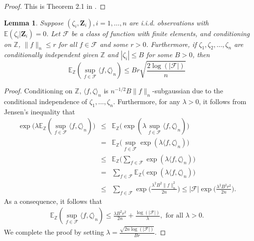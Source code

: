 \documentclass[11pt, preprint]{imsart}
\numberwithin{equation}{section}
\def \mcF{\mathcal{F}}
\def \bfZ{\mathbf{Z}}
\def \ev{\mathbb{E}}
\theoremstyle{plain}
\newtheorem{lemma}{\indent Lemma}
\theoremstyle{definition}
\begin{document}
\begin{proof}
This is Theorem 2.1 in \cite{bbm05}.
\end{proof}
\begin{lemma}\label{lemma:Massart:inequality}
Suppose $(\zeta_i, \bfZ_i), i=1,\ldots, n$ are i.i.d. observations with $\ev(\zeta_i | \bfZ_i)=0$. Let $\mcF$ be a class of function with finite elements, and  conditioning on $\mathbb{Z}$, $\|f\|_n\leq r$ for all $f\in \mcF$ and some $r>0$. Furthermore, if $\zeta_1,\zeta_2, \ldots, \zeta_n$ are conditionally independent given $\mathbb{Z}$ and $|\zeta_i|\leq B$ for some $B>0$, then 
\begin{equation*}
\ev_{\mathbb{Z}}(\sup_{f\in \mcF}\langle f, \zeta\rangle_n)\leq Br\sqrt{\frac{2\log(|\mcF|)}{n}}
\end{equation*}
\end{lemma}
\begin{proof}
Conditioning on $\mathbb{Z}$, $\langle f, \zeta\rangle_n$ is $n^{-1/2}B\|f\|_n$-subgaussian due to the conditional independence of $\zeta_1,\ldots, \zeta_n$. Furthermore, for any $\lambda>0$, it follows from Jensen’s inequality that
\begin{eqnarray*}
\exp\bigg(\lambda\ev_{\mathbb{Z}}(\sup_{f\in \mcF}\langle f, \zeta\rangle_n)\bigg)&\leq& \ev_{\mathbb{Z}}\bigg(\exp(\lambda\sup_{f\in \mcF}\langle f, \zeta\rangle_n)\bigg)\nonumber\\
&=& \ev_{\mathbb{Z}}\bigg(\sup_{f\in \mcF}\exp(\lambda\langle f, \zeta\rangle_n)\bigg)\nonumber\\
&\leq& \ev_{\mathbb{Z}}\bigg(\sum_{f\in \mcF}\exp(\lambda\langle f, \zeta\rangle_n)\bigg)\nonumber\\
&=& \sum_{f\in \mcF}\ev_{\mathbb{Z}}\bigg(\exp(\lambda\langle f, \zeta\rangle_n)\bigg)\nonumber\\
&\leq&  \sum_{f\in \mcF}\exp\bigg(\frac{\lambda^2B^2\|f\|_n^2}{2n}\bigg)\leq |\mcF|\exp\bigg(\frac{\lambda^2B^2r^2}{2n}\bigg).
\end{eqnarray*}
As a consequence, it follows that
\begin{eqnarray*}
	\ev_{\mathbb{Z}}(\sup_{f\in \mcF}\langle f, \zeta\rangle_n)\leq \frac{\lambda B^2r^2}{2n}+\frac{\log(|\mcF|)}{\lambda},\textrm{ for all } \lambda>0.
\end{eqnarray*}
We complete the proof by setting $\lambda=\frac{\sqrt{2n\log(|\mcF|)}}{Br}$.
\end{proof}
\end{document}
